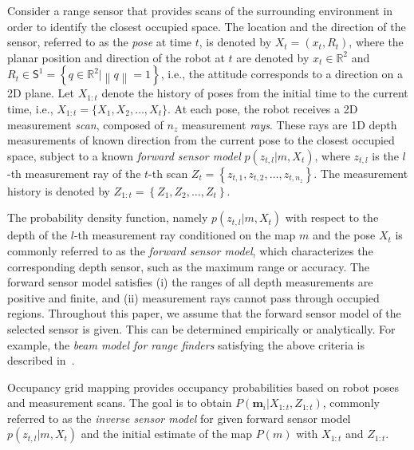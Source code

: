 \documentclass[smallextended]{svjour3}       %
\newcommand{\norm}[1]{\ensuremath{\left\| #1 \right\|}}
\newcommand{\braces}[1]{\ensuremath{\left\{ #1 \right\}}}
\renewcommand{\Re}{\ensuremath{\mathbb{R}}}
\newcommand{\Sph}{\ensuremath{\mathsf{S}}}
\begin{document}
Consider a range sensor that provides scans of the surrounding environment in order to identify the closest occupied space. The location and the direction of the sensor, referred to as the \emph{pose} at time $t$, is denoted by $X_t=(x_t,R_t)$, where the planar position and direction of the robot at $t$ are denoted by $x_t\in\Re^2$ and $R_t\in\Sph^1=\braces{q\in\Re^2|\norm{q}=1}$, i.e., the attitude corresponds to a direction on a 2D plane.  Let $X_{1:t}$ denote the history of poses from the initial time to the current time, i.e., $X_{1:t}=\{X_1,X_2,\ldots, X_t\}$. At each pose, the robot receives a 2D measurement \emph{scan}, composed of $n_z$ measurement \emph{rays}. These rays are 1D depth measurements of known direction from the current pose to the closest occupied space, subject to a known \emph{forward sensor model} $p(z_{t,l}|m,X_t)$, where $z_{t,l}$ is the $l$-th measurement ray of the $t$-th scan $Z_t=\braces{z_{t,1},z_{t,2},\ldots,z_{t,n_z}}$. The measurement history is denoted by $Z_{1:t}=\braces{Z_1,Z_2,\ldots,Z_t}$. 

The probability density function, namely $p(z_{t,l}|m,X_t)$ with respect to the depth of the $l$-th measurement ray conditioned on the map $m$ and the pose $X_t$ is commonly referred to as the \emph{forward sensor model}, which characterizes the corresponding depth sensor, such as the maximum range or accuracy. The forward sensor model satisfies  (i) the ranges of all depth measurements are positive and finite, and (ii) measurement rays cannot pass through occupied regions. Throughout this paper, we assume that the forward sensor model of the selected sensor is given. This can be determined empirically or analytically. For example, the \emph{beam model for range finders} satisfying  the above criteria is described in~\cite{ThrBurFox05}.


Occupancy grid mapping provides occupancy probabilities based on robot poses and measurement scans. The goal is to obtain $P(\mathbf{m}_i|X_{1:t},Z_{1:t})$, commonly referred to as the \emph{inverse sensor model} for given forward sensor model $p(z_{t,l}|m,X_t)$ and the initial estimate of the map $P(m)$ with $X_{1:t}$ and $Z_{1:t}$.
\end{document}
